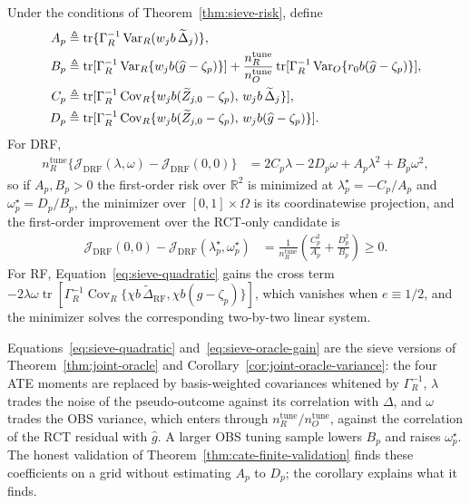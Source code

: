\begin{theoremcorollary}
\label{cor:sieve-oracle}
Under the conditions of Theorem~\ref{thm:sieve-risk}, define
\begin{align}
A_p&\triangleq\operatorname{tr}\{\Gamma_R^{-1}\operatorname{Var}_R(w_jb\,\widetilde\Delta_j)\},
\notag\\
B_p&\triangleq\operatorname{tr}[\Gamma_R^{-1}\operatorname{Var}_R\{w_jb(\widehat g-\zeta_p)\}]
+\frac{n_R^{\mathrm{tune}}}{n_O^{\mathrm{tune}}}\operatorname{tr}[\Gamma_R^{-1}\operatorname{Var}_O\{r_0b(\widehat g-\zeta_p)\}],
\notag\\
C_p&\triangleq\operatorname{tr}[\Gamma_R^{-1}\operatorname{Cov}_R\{w_jb(\widetilde Z_{j,0}-\zeta_p),\,w_jb\,\widetilde\Delta_j\}],
\notag\\
D_p&\triangleq\operatorname{tr}[\Gamma_R^{-1}\operatorname{Cov}_R\{w_jb(\widetilde Z_{j,0}-\zeta_p),\,w_jb(\widehat g-\zeta_p)\}].
\label{eq:sieve-moments}
\end{align}
For DRF,
\begin{align}
n_R^{\mathrm{tune}}\{\mathcal J_{\mathrm{DRF}}(\lambda,\omega)-\mathcal J_{\mathrm{DRF}}(0,0)\}
&=2C_p\lambda-2D_p\omega+A_p\lambda^2+B_p\omega^2,
\label{eq:sieve-quadratic}
\end{align}
so if $A_p,B_p>0$ the first-order risk over $\mathbb R^2$ is minimized at $\lambda_p^\star=-C_p/A_p$ and $\omega_p^\star=D_p/B_p$, the minimizer over $[0,1]\times\Omega$ is its coordinatewise projection, and the first-order improvement over the RCT-only candidate is
\begin{align}
\mathcal J_{\mathrm{DRF}}(0,0)-\mathcal J_{\mathrm{DRF}}(\lambda_p^\star,\omega_p^\star)
&=\frac{1}{n_R^{\mathrm{tune}}}\left(\frac{C_p^2}{A_p}+\frac{D_p^2}{B_p}\right)\geq0.
\label{eq:sieve-oracle-gain}
\end{align}
For RF, Equation~\eqref{eq:sieve-quadratic} gains the cross term $-2\lambda\omega\operatorname{tr}[\Gamma_R^{-1}\operatorname{Cov}_R\{\chi b\,\widetilde\Delta_{\mathrm{RF}},\chi b(\widehat g-\zeta_p)\}]$, which vanishes when $e\equiv1/2$, and the minimizer solves the corresponding two-by-two linear system.
\end{theoremcorollary}
Equations~\eqref{eq:sieve-quadratic} and~\eqref{eq:sieve-oracle-gain} are the sieve versions of Theorem~\ref{thm:joint-oracle} and Corollary~\ref{cor:joint-oracle-variance}: the four ATE moments are replaced by basis-weighted covariances whitened by $\Gamma_R^{-1}$, $\lambda$ trades the noise of the pseudo-outcome against its correlation with $\Delta$, and $\omega$ trades the OBS variance, which enters through $n_R^{\mathrm{tune}}/n_O^{\mathrm{tune}}$, against the correlation of the RCT residual with $\widehat g$. A larger OBS tuning sample lowers $B_p$ and raises $\omega_p^\star$. The honest validation of Theorem~\ref{thm:cate-finite-validation} finds these coefficients on a grid without estimating $A_p$ to $D_p$; the corollary explains what it finds.

